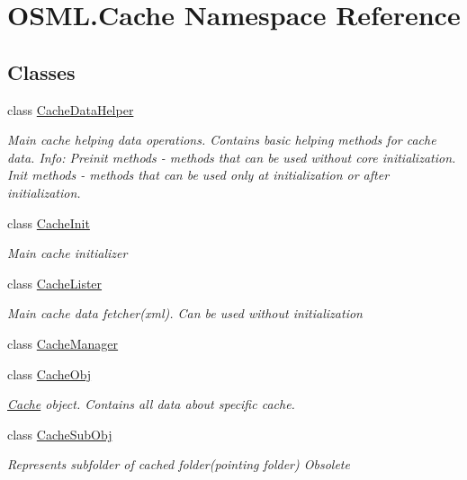 \hypertarget{namespaceOSML_1_1Cache}{}\section{O\+S\+M\+L.\+Cache Namespace Reference}
\label{namespaceOSML_1_1Cache}
\subsection*{Classes}
\begin{DoxyCompactItemize}
\item 
class \mbox{\hyperlink{classOSML_1_1Cache_1_1CacheDataHelper}{Cache\+Data\+Helper}}
\begin{DoxyCompactList}\small\item\em Main cache helping data operations. Contains basic helping methods for cache data. Info\+: Preinit methods -\/ methods that can be used without core initialization. Init methods -\/ methods that can be used only at initialization or after initialization. \end{DoxyCompactList}\item 
class \mbox{\hyperlink{classOSML_1_1Cache_1_1CacheInit}{Cache\+Init}}
\begin{DoxyCompactList}\small\item\em Main cache initializer \end{DoxyCompactList}\item 
class \mbox{\hyperlink{classOSML_1_1Cache_1_1CacheLister}{Cache\+Lister}}
\begin{DoxyCompactList}\small\item\em Main cache data fetcher(xml). Can be used without initialization \end{DoxyCompactList}\item 
class \mbox{\hyperlink{classOSML_1_1Cache_1_1CacheManager}{Cache\+Manager}}
\item 
class \mbox{\hyperlink{classOSML_1_1Cache_1_1CacheObj}{Cache\+Obj}}
\begin{DoxyCompactList}\small\item\em \mbox{\hyperlink{namespaceOSML_1_1Cache}{Cache}} object. Contains all data about specific cache. \end{DoxyCompactList}\item 
class \mbox{\hyperlink{classOSML_1_1Cache_1_1CacheSubObj}{Cache\+Sub\+Obj}}
\begin{DoxyCompactList}\small\item\em Represents subfolder of cached folder(pointing folder) Obsolete \end{DoxyCompactList}\item 

\end{DoxyCompactItemize}
